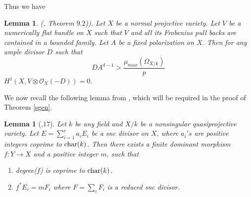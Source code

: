 \documentclass[12pt,oneside]{amsart}
\theoremstyle{plain}
\newtheorem{lem}[thm]{Lemma}
\theoremstyle{definition}
\newcommand{\tensor}{\otimes}
\newcommand{\Char}{{\rm char}}
\newcommand{\sO}{{\mathcal O}}
\begin{document}
Thus we have
\begin{lem}{\rm (\cite{langer1}, Theorem $9.2$))}. \label{normall} Let $X$ be a normal projective variety. Let $V$ be a numerically flat bundle on $X$ such that $V$ and all its Frobenius pull backs are contained in a bounded family. Let $A$ be a fixed polarization on $X$. Then for any ample divisor $D$ such that 
$$ DA^{d-1}>\frac{\mu_{max}(\Omega_{X/k})}{p}$$
$H^1(X,V\tensor \sO_X(-D))=0$. 
\end{lem}

We now recall the following lemma from \cite{kawamata}, which will be required in the proof of Theorem \ref{sgen}. 
\begin{lem}[\cite{kawamata},$17$]\label{ktrick}
Let $k$ be any field and $X/k$ be a nonsingular quasiprojective variety. Let $E=\sum_{i=1}^r a_iE_i$ be a snc divisor on $X$, where $a_i's$ are positive integers coprime to $\Char(k)$. Then there exists a finite dominant morphism $f:Y\to X$ and a positive integer $m$, such that 
\begin{enumerate} 
 \item degree($f$) is coprime to $\Char(k)$.
 \item $f^*E_i = mF_i$ where $F=\sum_i F_i$ is a reduced snc divisor.
\end{enumerate}
\end{lem}
\end{document}
